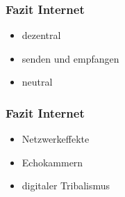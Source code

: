 \documentclass[12pt]{beamer}
\begin{document}
\begin{frame}
	\frametitle{Fazit Internet}
	\begin{itemize}
		\item<1-> dezentral
		\item<2-> senden und empfangen
    \item<3-> neutral
	\end{itemize}
\end{frame}

\begin{frame}
	\frametitle{Fazit Internet}
  \begin{itemize}
    \item<1-> Netzwerkeffekte 
    \item<2-> Echokammern
    \item<3-> digitaler Tribalismus
\end{itemize}
\end{frame}
\end{document}
